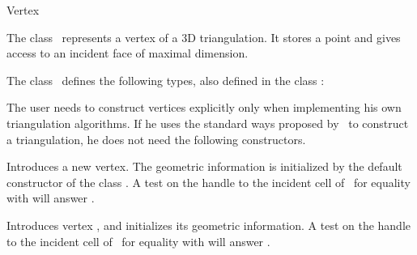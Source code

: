

\begin{ccRefClass}{Vertex}  %


\ccDefinition
  
The class \ccRefName\ represents a vertex of a 3D triangulation. 
It stores a point and gives access to an incident face of 
maximal dimension.


\ccInheritsFrom
{}

\ccTypes
{}
\ccThreeToTwo
The class \ccClassTemplateName\ defines the following types, also
defined in the class :

\ccGlue
{}
\ccGlue
{}


\begin{ccAdvanced}
\ccCreation
The user needs to construct vertices explicitly only when implementing his
own triangulation algorithms. If he uses the standard ways proposed by 
\cgal\ to construct a triangulation, he does not need the following
constructors. 

{Introduces a new vertex. The geometric information is initialized by
the default constructor of the class . A test on the handle
to the incident cell of \ccVar\ for equality with  will
answer .} 

{Introduces vertex \ccVar, and initializes its geometric information.
A test on the handle
to the incident cell of \ccVar\ for equality with  will
answer .}


\end{ccAdvanced}
\end{ccRefClass}
